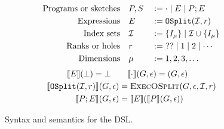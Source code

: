 \begin{figure}[t]
    \centering
    \small
    \vspace{-1em}
    \begin{alignat*}{2}
        \text{Programs or sketches}\quad & P,S && := \cdot \mid E \mid P;E \\
        \text{Expressions}\quad & E &&:= \mathtt{OSplit}(\mathcal{I}, r) \\
        \text{Index sets}\quad & \mathcal{I}  &&:= \{I_\mu\} \mid \mathcal{I} \cup \{I_\mu\} \\
        \text{Ranks or holes}\quad & r     &&:=\ ?? \mid 1 \mid 2 \mid \cdots \\
        \text{Dimensions}\quad & \mu   &&:= 1, 2, 3, \ldots
    \end{alignat*}
    \vspace{-2em}
    \begin{align*}
    \llbracket E \rrbracket(\bot) = \bot \quad&\quad \llbracket \cdot \rrbracket(G, \epsilon) = (G, \epsilon) \\
    \llbracket \mathtt{OSplit}(\mathcal{I}, r) \rrbracket(G, \epsilon) &= \textsc{ExecOSplit}(G, \epsilon, \mathcal{I}, r)\\
    \llbracket P;E \rrbracket(G,\epsilon) &= \llbracket E \rrbracket(\llbracket P \rrbracket(G,\epsilon))
    \end{align*}
    \vspace{-2em}
    \caption{Syntax and semantics for the DSL.}\label{fig:dsl}
\end{figure}

